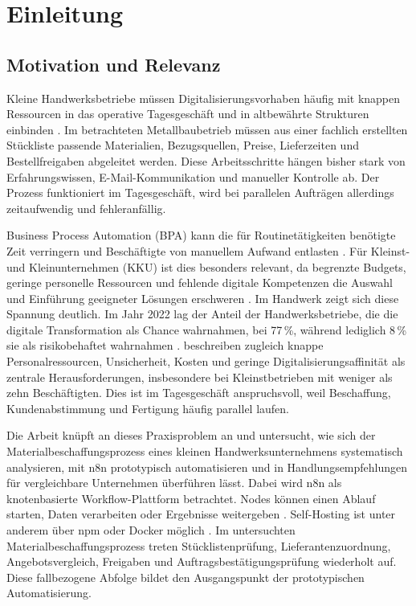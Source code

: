 \documentclass[a4paper,12pt]{article}
\begin{document}
\clearpage
{}

\section{Einleitung}

\subsection{Motivation und Relevanz}
Kleine Handwerksbetriebe müssen Digitalisierungsvorhaben häufig mit knappen Ressourcen in das operative Tagesgeschäft und in altbewährte Strukturen einbinden \parencite{beuchel_digitalisierung_2024}. Im betrachteten Metallbaubetrieb müssen aus einer fachlich erstellten Stückliste passende Materialien, Bezugsquellen, Preise, Lieferzeiten und Bestellfreigaben abgeleitet werden. Diese Arbeitsschritte hängen bisher stark von Erfahrungswissen, E-Mail-Kommunikation und manueller Kontrolle ab. Der Prozess funktioniert im Tagesgeschäft, wird bei parallelen Aufträgen allerdings zeitaufwendig und fehleranfällig.

Business Process Automation (BPA) kann die für Routinetätigkeiten benötigte Zeit verringern und Beschäftigte von manuellem Aufwand entlasten \parencite{moreira_business_2024}. Für Kleinst- und Kleinunternehmen (KKU) ist dies besonders relevant, da begrenzte Budgets, geringe personelle Ressourcen und fehlende digitale Kompetenzen die Auswahl und Einführung geeigneter Lösungen erschweren \parencite{moreira_business_2024}. Im Handwerk zeigt sich diese Spannung deutlich. Im Jahr 2022 lag der Anteil der Handwerksbetriebe, die die digitale Transformation als Chance wahrnahmen, bei 77\,\%, während lediglich 8\,\% sie als risikobehaftet wahrnahmen \parencite{beuchel_digitalisierung_2024}. \Textcite{beuchel_digitalisierung_2024} beschreiben zugleich knappe Personalressourcen, Unsicherheit, Kosten und geringe Digitalisierungsaffinität als zentrale Herausforderungen, insbesondere bei Kleinstbetrieben mit weniger als zehn Beschäftigten. Dies ist im Tagesgeschäft anspruchsvoll, weil Beschaffung, Kundenabstimmung und Fertigung häufig parallel laufen.

Die Arbeit knüpft an dieses Praxisproblem an und untersucht, wie sich der Materialbeschaffungsprozess eines kleinen Handwerksunternehmens systematisch analysieren, mit n8n prototypisch automatisieren und in Handlungsempfehlungen für vergleichbare Unternehmen überführen lässt. Dabei wird n8n als knotenbasierte Workflow-Plattform betrachtet. Nodes können einen Ablauf starten, Daten verarbeiten oder Ergebnisse weitergeben \parencite{n8n_docs_2026}. Self-Hosting ist unter anderem über npm oder Docker möglich \parencite{n8n_docs_2026}. Im untersuchten Materialbeschaffungsprozess treten Stücklistenprüfung, Lieferantenzuordnung, Angebotsvergleich, Freigaben und Auftragsbestätigungsprüfung wiederholt auf. Diese fallbezogene Abfolge bildet den Ausgangspunkt der prototypischen Automatisierung.
\end{document}
